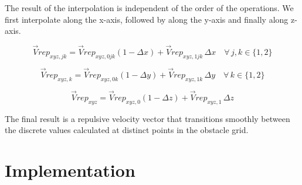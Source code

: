 \documentclass[]{article}
\begin{document}
The result of the interpolation is independent of the order of the operations. We first interpolate along the x-axis, followed by along the y-axis and finally along z-axis.


\begin{equation}
	\label{eq: interp x}
	\vec{V}rep_{xyz,jk} = \vec{V}rep_{xyz,0jk}(1 - \Delta x) + \vec{V}rep_{xyz,1jk} \, \Delta x \quad \forall \, j, k \in \{1, 2\}
\end{equation}

%

\begin{equation}
	\label{eq: interp y}
	\vec{V}rep_{xyz,k} = \vec{V}rep_{xyz,0k}(1 - \Delta y) + \vec{V}rep_{xyz,1k} \, \Delta y \quad \forall \, k \in \{1, 2\}
\end{equation}

\begin{equation}
	\label{eq: interp z}
	\vec{V}rep_{xyz} = \vec{V}rep_{xyz,0}(1 - \Delta z) + \vec{V}rep_{xyz,1} \, \Delta z 
\end{equation}

The final result is a repulsive velocity vector that transitions smoothly between the discrete values calculated at distinct points in the obstacle grid.


\section{Implementation}
\end{document}

